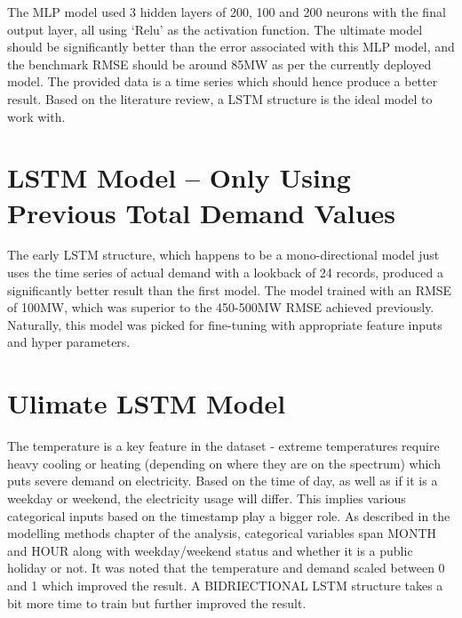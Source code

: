 \documentclass[mstat,12pt]{unswthesis}
\begin{document}
\bigskip

The MLP model used 3 hidden layers of 200, 100 and 200 neurons with the
final output layer, all using `Relu' as the activation function. The
ultimate model should be significantly better than the error associated
with this MLP model, and the benchmark RMSE should be around 85MW as per
the currently deployed model. The provided data is a time series which
should hence produce a better result. Based on the literature review, a
LSTM structure is the ideal model to work with.

\bigskip

\hypertarget{lstm-model-only-using-previous-total-demand-values}{%
\section{LSTM Model -- Only Using Previous Total Demand
Values}\label{lstm-model-only-using-previous-total-demand-values}}

The early LSTM structure, which happens to be a mono-directional model
just uses the time series of actual demand with a lookback of 24
records, produced a significantly better result than the first model.
The model trained with an RMSE of 100MW, which was superior to the
450-500MW RMSE achieved previously. Naturally, this model was picked for
fine-tuning with appropriate feature inputs and hyper parameters.

\bigskip

\hypertarget{ulimate-lstm-model}{%
\section{Ulimate LSTM Model}\label{ulimate-lstm-model}}

The temperature is a key feature in the dataset - extreme temperatures
require heavy cooling or heating (depending on where they are on the
spectrum) which puts severe demand on electricity. Based on the time of
day, as well as if it is a weekday or weekend, the electricity usage
will differ. This implies various categorical inputs based on the
timestamp play a bigger role. As described in the modelling methods
chapter of the analysis, categorical variables span MONTH and HOUR along
with weekday/weekend status and whether it is a public holiday or not.
It was noted that the temperature and demand scaled between 0 and 1
which improved the result. A BIDRIECTIONAL LSTM structure takes a bit
more time to train but further improved the result.

\bigskip
\end{document}

